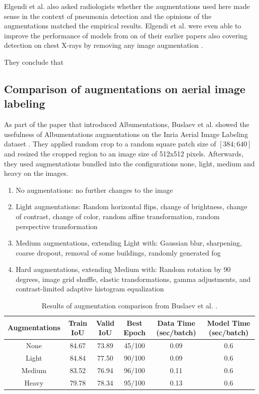 \documentclass[10pt]{book}
\begin{document}
Elgendi et al. also asked radiologists whether the augmentations used here made sense in the context of pneumonia detection and the opinions of the augmentations matched the empirical results. Elgendi et al. were even able to improve the performance of models from on of their earlier papers also covering detection on chest X-rays by removing any image augmentation \cite{elgendi2020performance, elgendi2021effectiveness}.

They conclude that \cite[optimization over each geometric augmentation is needed. For example, defining an “acceptable” range of rotation.]{elgendi2021effectiveness}

\subsection{Comparison of augmentations on aerial image labeling}

As part of the paper that introduced Albumentations, Buslaev et al. showed the usefulness of Albumentations augmentations on the Inria Aerial Image Labeling dataset \cite{info11020125,maggiori2017can}. They applied random crop to a random square patch size of $[384;640]$ and resized the cropped region to an image size of 512x512 pixels. Afterwards, they used augmentations bundled into the configurations none, light, medium and heavy on the images.

\begin{enumerate}
  \item No augmentations: no further changes to the image
  \item Light augmentations: Random horizontal flips, change of brightness, change of contrast, change of color, random affine transformation, random perspective transformation
  \item Medium augmentations, extending Light with: Gaussian blur, sharpening, coarse dropout, removal of some buildings, randomly generated fog
  \item Hard augmentations, extending Medium with: Random rotation by 90 degrees, image grid shuffle, elastic transformations, gamma adjustments, and contrast-limited adaptive histogram equalization
\end{enumerate}

\begin{table}
  \begin{tabular}{ c c c c c c }
   Augmentations & Train IoU & Valid IoU & Best Epoch & Data Time (sec/batch) & Model Time (sec/batch) \\ 
   \hline
   None & 84.67 & 73.89 & 45/100 & 0.09 & 0.6\\
   Light & 84.84 & 77.50 & 90/100 & 0.09 & 0.6\\
   Medium & 83.52 & 76.94 & 96/100 & 0.11 & 0.6\\
   Heavy & 79.78 & 78.34 & 95/100 & 0.13 & 0.6\\
   \hline
  \end{tabular}
  \caption{\label{tab:alb-iou}Results of augmentation comparison from Buslaev et al. \cite{info11020125}.}
\end{table}
\end{document}
